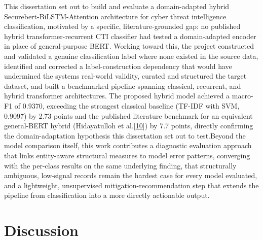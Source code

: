 \documentclass[12pt,a4paper]{report}
\begin{document}
This dissertation set out to build and evaluate a domain-adapted hybrid
Securebert-BiLSTM-Attention architecture for cyber threat intelligence
classification, motivated by a specific, literature-grounded gap: no
published hybrid transformer-recurrent CTI classifier had tested a
domain-adapted encoder in place of general-purpose BERT. Working toward
this, the project constructed and validated a genuine classification
label where none existed in the source data, identified and corrected a
label-construction dependency that would have undermined the
system\textquotesingle s real-world validity, curated and structured the
target dataset, and built a benchmarked pipeline spanning classical,
recurrent, and hybrid transformer architectures. The proposed hybrid
model achieved a macro-F1 of 0.9370, exceeding the strongest classical
baseline (TF-IDF with SVM, 0.9097) by 2.73 points and the published
literature benchmark for an equivalent general-BERT hybrid (Hidayatulloh
et
al.{[}\href{file:///D:/Downloads/final-report-formatted-v4(1).docx\#ref_10}{\ul{10}}{]})
by 7.7 points, directly confirming the domain-adaptation hypothesis this
dissertation set out to test.Beyond the model comparison itself, this
work contributes a diagnostic evaluation approach that links
entity-aware structural measures to model error patterns, converging
with the per-class results on the same underlying finding, that
structurally ambiguous, low-signal records remain the hardest case for
every model evaluated, and a lightweight, unsupervised
mitigation-recommendation step that extends the pipeline from
classification into a more directly actionable output.
\section{Discussion}
\end{document}
